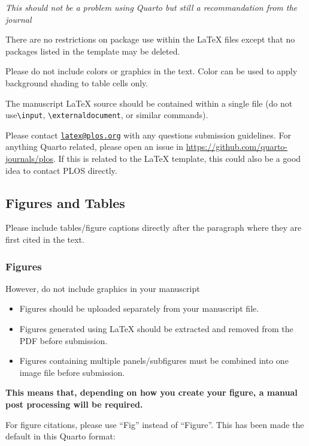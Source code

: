 \documentclass[
  10pt,
  letterpaper,
]{article}
\providecommand{\tightlist}{%
  \setlength{\itemsep}{0pt}\setlength{\parskip}{0pt}}\usepackage{longtable,booktabs,array}
\begin{document}
\emph{This should not be a problem using Quarto but still a
recommandation from the journal}

There are no restrictions on package use within the LaTeX files except
that no packages listed in the template may be deleted.

Please do not include colors or graphics in the text. Color can be used
to apply background shading to table cells only.

The manuscript LaTeX source should be contained within a single file (do
not use\texttt{\textbackslash{}input},
\texttt{\textbackslash{}externaldocument}, or similar commands).

Please contact \href{mailto:latex@plos.org}{\nolinkurl{latex@plos.org}}
with any questions submission guidelines. For anything Quarto related,
please open an issue in \url{https://github.com/quarto-journals/plos}.
If this is related to the LaTeX template, this could also be a good idea
to contact PLOS directly.

\subsection{Figures and Tables}\label{figures-and-tables}

Please include tables/figure captions directly after the paragraph where
they are first cited in the text.

\subsubsection{Figures}\label{figures}

However, do not include graphics in your manuscript

\begin{itemize}
\tightlist
\item
  Figures should be uploaded separately from your manuscript file.
\item
  Figures generated using LaTeX should be extracted and removed from the
  PDF before submission.
\item
  Figures containing multiple panels/subfigures must be combined into
  one image file before submission.
\end{itemize}

\textbf{This means that, depending on how you create your figure, a
manual post processing will be required.}

For figure citations, please use ``Fig'' instead of ``Figure''. This has
been made the default in this Quarto format:
\end{document}
